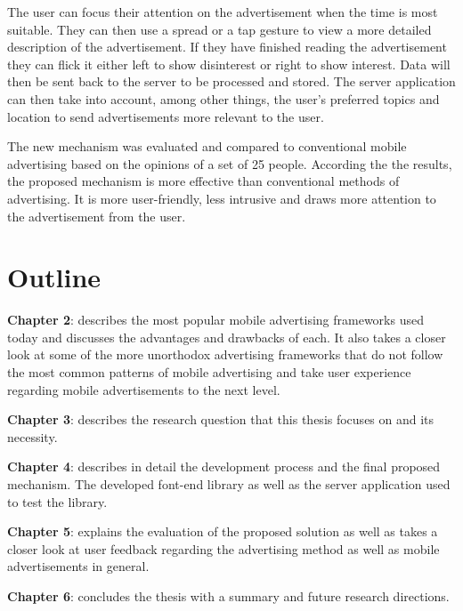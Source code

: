 The user can focus their attention on the advertisement when the time is most suitable. They can then use a spread or a tap gesture to view a more detailed description of the advertisement. If they have finished reading the advertisement they can flick it either left to show disinterest or right to show interest. Data will then be sent back to the server to be processed and stored. The server application can then take into account, among other things, the user's preferred topics and location to send advertisements more relevant to the user.

The new mechanism was evaluated and compared to conventional mobile advertising based on the opinions of a set of 25 people. According the the results, the proposed mechanism is more effective than conventional methods of advertising. It is more user-friendly, less intrusive and draws more attention to the advertisement from the user.

\section{Outline}

\noindent \textbf{Chapter 2}: describes the most popular mobile advertising frameworks used today and discusses the advantages and drawbacks of each. It also takes a closer look at some of the more unorthodox advertising frameworks that do not follow the most common patterns of mobile advertising and take user experience regarding mobile advertisements to the next level.

\noindent \textbf{Chapter 3}: describes the research question that this thesis focuses on and its necessity.

\noindent \textbf{Chapter 4}: describes in detail the development process and the final proposed mechanism. The developed font-end library as well as the server application used to test the library.

\noindent \textbf{Chapter 5}: explains the evaluation of the proposed solution as well as takes a closer look at user feedback regarding the advertising method as well as mobile advertisements in general.

\noindent \textbf{Chapter 6}: concludes the thesis with a summary and future research directions.